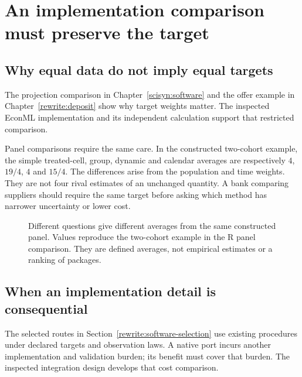 \section{An implementation comparison must preserve the target}
\label{reading:software-conclusions}

\subsection{Why equal data do not imply equal targets}

The projection comparison in Chapter~\ref{scisyn:software} and the offer
example in Chapter~\ref{rewrite:deposit} show why target weights matter.
The inspected EconML implementation and its independent calculation support
that restricted comparison. \citep{exec19_econml_source,exec19_econml_reference}

Panel comparisons require the same care. In the constructed two-cohort example,
the simple treated-cell, group, dynamic and calendar averages are respectively
$4$, $19/4$, $4$ and $15/4$. The differences arise from the population and time
weights. They are not four rival estimates of an unchanged quantity. A bank
comparing suppliers should require the same target before asking which method
has narrower uncertainty or lower cost.~\citep{exec24_panelr_did,exec24_panelr_contract}

\begin{figure}[htbp]\centering
{}
\caption{Different questions give different averages from the same constructed
panel. Values reproduce the two-cohort example in the R panel comparison.
They are defined averages, not empirical estimates or a ranking of packages.
\citep{exec24_panelr_contract}}
\label{reading:panel-averages}
\end{figure}

\subsection{When an implementation detail is consequential}
The selected routes in Section~\ref{rewrite:software-selection} use existing
procedures under declared targets and observation laws. A native port incurs
another implementation and validation burden; its benefit must cover that
burden. The inspected integration design develops that cost comparison.
\citep{exec16_s10_design}

